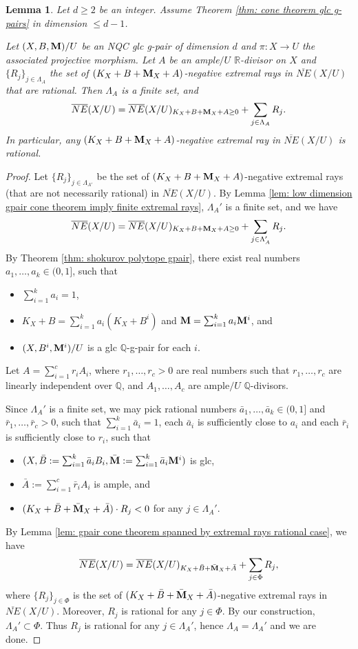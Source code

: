 \documentclass[11pt]{amsart}
\numberwithin{equation}{section}
\newcommand{\Mm}{{\bf{M}}}
\newcommand{\Qq}{\mathbb{Q}}
\newcommand{\Rr}{\mathbb{R}}
\newtheorem{lem}[thm]{Lemma}
\theoremstyle{definition}
\theoremstyle{definition}
\theoremstyle{definition}
\begin{document}
\begin{lem}\label{lem: gpair cone theorem spanned by extremal rays real case}
Let $d\geq 2$ be an integer. Assume Theorem \ref{thm: cone theorem glc g-pairs} in dimension $\leq d-1$.

Let $(X,B,\Mm)/U$ be an NQC glc g-pair of dimension $d$ and $\pi: X\rightarrow U$ the associated projective morphism. Let $A$ be an ample$/U$ $\Rr$-divisor on $X$ and $\{R_j\}_{j\in\Lambda_A}$ the set of $(K_X+B+\Mm_X+A)$-negative extremal rays in $\overline{NE}(X/U)$ that are rational. Then $\Lambda_A$ is a finite set, and
$$\overline{NE}(X/U)=\overline{NE}(X/U)_{K_X+B+\Mm_X+A\geq 0}+\sum_{j\in\Lambda_A}R_j.$$
In particular, any $(K_X+B+\Mm_X+A)$-negative extremal ray in $\overline{NE}(X/U)$ is rational.
\end{lem}
\begin{proof}
Let $\{R_j\}_{j\in\Lambda_{A'}}$ be the set of $(K_X+B+\Mm_X+A)$-negative extremal rays (that are not necessarily rational) in $\overline{NE}(X/U)$. By Lemma \ref{lem: low dimension gpair cone theorem imply finite extremal rays}, $\Lambda_A'$ is a finite set, and we have
    $$\overline{NE}(X/U)=\overline{NE}(X/U)_{K_X+B+\Mm_X+A\geq 0}+\sum_{j\in\Lambda'_A}R_j.$$
By Theorem \ref{thm: shokurov polytope gpair}, there exist real numbers $a_1,\dots,a_k\in (0,1]$, such that
\begin{itemize}
\item $\sum_{i=1}^ka_i=1$,
    \item $K_X+B=\sum_{i=1}^k a_i(K_X+B^i)$ and $\Mm=\sum_{i=1}^ka_i\Mm^i$, and
    \item $(X,B^i,\Mm^i)/U$ is a glc $\Qq$-g-pair for each $i$.
\end{itemize}
Let $A=\sum_{i=1}^cr_iA_i$, where $r_1,\dots,r_c>0$ are real numbers such that $r_1,\dots,r_c$ are linearly independent over $\Qq$, and $A_1,\dots,A_c$ are ample$/U$ $\Qq$-divisors.

Since $\Lambda_A'$ is a finite set, we may pick rational numbers $\bar a_1,\dots,\bar a_k\in (0,1]$ and $\bar r_1,\dots,\bar r_c>0$, such that $\sum_{i=1}^k\bar a_i=1$, each $\bar a_i$ is sufficiently close to $a_i$ and each $\bar r_i$ is sufficiently close to $r_i$, such that 
\begin{itemize}
    \item $(X,\bar B:=\sum_{i=1}^k\bar a_iB_i,\bar\Mm:=\sum_{i=1}^k\bar a_i\Mm^i)$ is glc,
    \item $\bar A:=\sum_{i=1}^c\bar r_iA_i$ is ample, and
    \item $(K_X+\bar B+\bar \Mm_X+\bar A)\cdot R_j<0$ for any $j\in\Lambda_A'$.
\end{itemize}
 By Lemma \ref{lem: gpair cone theorem spanned by extremal rays rational case}, we have
$$\overline{NE}(X/U)=\overline{NE}(X/U)_{K_X+\bar B+\bar \Mm_X+\bar A}+\sum_{j\in\Phi} R_j,$$
where $\{R_j\}_{j\in\Phi}$ is the set of $(K_X+\bar B+\bar \Mm_X+\bar A)$-negative extremal rays in $\overline{NE}(X/U)$. Moreover, $R_j$ is rational for any $j\in\Phi$. By our construction, $\Lambda_A'\subset\Phi$. Thus $R_j$ is rational for any $j\in\Lambda_A'$, hence $\Lambda_A=\Lambda_A'$ and we are done.
\end{proof}
\end{document}
